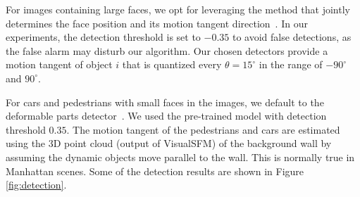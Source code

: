 For images containing large faces, we opt for leveraging the method that jointly determines the face position and its motion tangent direction~\cite{Xiangxin_CVPR12}.
In our experiments,
the detection threshold is set to $-0.35$ to avoid false detections, as the false alarm may disturb our algorithm. Our chosen detectors provide a motion tangent of object $i$ that is  quantized every $\theta=15^{\circ}$ in the range of $-90^{\circ}$ and $90^{\circ}$.


For cars and pedestrians with small faces in the images, we default to the deformable parts
detector~\cite{lsvm-pami,voc-release5}. %
We used the pre-trained model with detection threshold $0.35$.
The motion tangent of the pedestrians and cars are estimated using the 3D point cloud (output of VisualSFM) of the background wall by assuming the dynamic objects move parallel to the wall. This is normally true in Manhattan scenes. Some of the detection results are shown in Figure \ref{fig:detection}.

